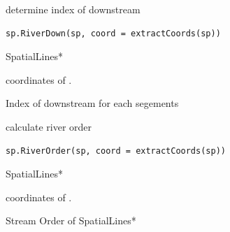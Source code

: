\documentclass[a4paper]{book}
\begin{document}
%
\begin{Description}\relax
determine index of downstream
\end{Description}
%
\begin{Usage}
\begin{verbatim}
sp.RiverDown(sp, coord = extractCoords(sp))
\end{verbatim}
\end{Usage}
%
\begin{Arguments}
\begin{ldescription}
\item[\code{sp}] SpatialLines*

\item[\code{coord}] coordinates of .
\end{ldescription}
\end{Arguments}
%
\begin{Value}
Index of downstream for each segements
\end{Value}
%
\begin{Description}\relax
calculate river order
\end{Description}
%
\begin{Usage}
\begin{verbatim}
sp.RiverOrder(sp, coord = extractCoords(sp))
\end{verbatim}
\end{Usage}
%
\begin{Arguments}
\begin{ldescription}
\item[\code{sp}] SpatialLines*

\item[\code{coord}] coordinates of .
\end{ldescription}
\end{Arguments}
%
\begin{Value}
Stream Order of SpatialLines*
\end{Value}
%
\begin{Examples}
\end{Examples}
\end{document}
